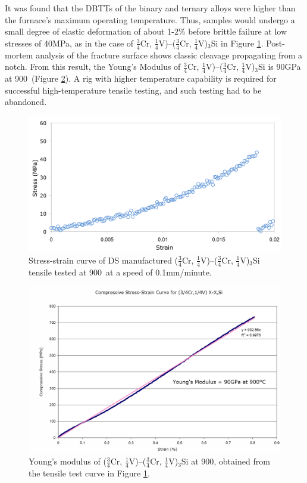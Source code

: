 It was found that the DBTTs of the binary and ternary alloys were higher than the furnace’s maximum operating temperature.  Thus, samples would undergo a small degree of elastic deformation of about 1-2\% before brittle failure at low stresses of 40MPa, as in the case of $\frac{3}{4}$Cr, $\frac{1}{4}$V)--($\frac{3}{4}$Cr, $\frac{1}{4}$V)$_3$Si in Figure \ref{fig:lcftensile}.  Post-mortem analysis of the fracture surface shows classic cleavage propagating from a notch.  From this result, the Young's Modulus of $\frac{3}{4}$Cr, $\frac{1}{4}$V)--($\frac{3}{4}$Cr, $\frac{1}{4}$V)$_3$Si is 90GPa at 900\celsius\ (Figure \ref{fig:Cr75modulus}).  A rig with higher temperature capability is required for successful high-temperature tensile testing, and such testing had to be abandoned.

%
\begin{figure}[H]
\begin{center}
\includegraphics[width=16cm]{lcftensile}
\caption{Stress-strain curve of DS manufactured ($\frac{3}{4}$Cr, $\frac{1}{4}$V)--($\frac{3}{4}$Cr, $\frac{1}{4}$V)$_3$Si tensile tested at 900\celsius\ at a speed of 0.1mm/minute.}
\label{fig:lcftensile}
\end{center}
\end{figure}
%
%
\begin{figure}[H]
\begin{center}
\includegraphics[width=14cm]{75Crmodulus}
\caption{Young's modulus of ($\frac{3}{4}$Cr, $\frac{1}{4}$V)--($\frac{3}{4}$Cr, $\frac{1}{4}$V)$_3$Si at 900\celsius, obtained from the tensile test curve in Figure \ref{fig:lcftensile}.}
\label{fig:Cr75modulus}
\end{center}
\end{figure}
